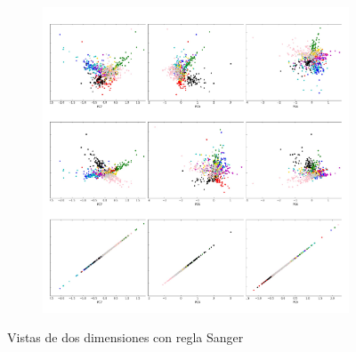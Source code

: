 \begin{figure}[ht!]	
	~\centering
	\begin{subfigure}[b]{0.5\textwidth}
		\includegraphics[width=\linewidth]{img/sanger/9dim-COLLAGE5}
	\end{subfigure}%
	\caption{Vistas de dos dimensiones con regla Sanger}
\end{figure}


